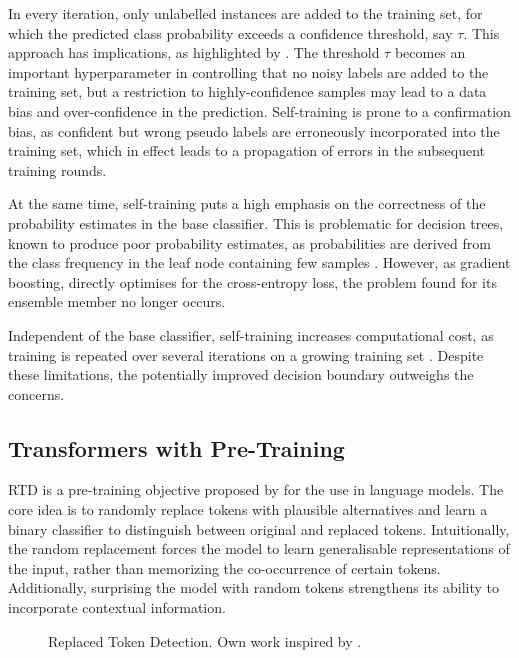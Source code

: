 In every iteration, only unlabelled instances are added to the training set, for which the predicted class probability exceeds a confidence threshold, say $\tau$. This approach has implications, as highlighted by \textcite[][2]{chenDebiasedSelfTrainingSemiSupervised2022}. The threshold $\tau$ becomes an important hyperparameter in controlling that no noisy labels are added to the training set, but a restriction to highly-confidence samples may lead to a data bias and over-confidence in the prediction. Self-training is prone to a confirmation bias, as confident but wrong pseudo labels are erroneously incorporated into the training set, which in effect leads to a propagation of errors in the subsequent training rounds.

At the same time, self-training puts a high emphasis on the correctness of the probability estimates in the base classifier. This is problematic for decision trees, known to produce poor probability estimates, as probabilities are derived from the class frequency in the leaf node containing few samples \autocite[][357--358]{tanhaSemisupervisedSelftrainingDecision2017}. However, as gradient boosting, directly optimises for the cross-entropy loss, the problem found for its ensemble member no longer occurs.

Independent of the base classifier, self-training increases computational cost, as training is repeated over several iterations on a growing training set \autocite[][9]{zophRethinkingPretrainingSelftraining2020}. Despite these limitations, the potentially improved decision boundary outweighs the concerns.

\subsection{Transformers with Pre-Training}\label{sec:extensions-to-transformer}

\gls{RTD} is a pre-training objective proposed by \textcite[][2--3]{clarkElectraPretrainingText2020} for the use in language models. The core idea is to randomly replace tokens with plausible alternatives and learn a binary classifier to distinguish between original and replaced tokens. Intuitionally, the random replacement forces the model to learn generalisable representations of the input, rather than memorizing the co-occurrence of certain tokens. Additionally, surprising the model with random tokens strengthens its ability to incorporate contextual information.

\begin{figure}[ht]
    \centering
    {\renewcommand\normalsize{\small}
        \normalsize
        }
    \caption[Replaced Token Detection]{Replaced Token Detection. Own work inspired by \autocite[][2--3]{clarkElectraPretrainingText2020}.}
    \label{fig:random-token-replacement}
\end{figure}

